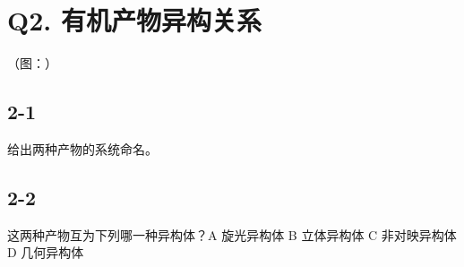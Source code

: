 \section*{Q2. 有机产物异构关系}
（图：）

\subsection*{2-1}
给出两种产物的系统命名。

\subsection*{2-2}
这两种产物互为下列哪⼀种异构体？A 旋光异构体 B ⽴体异构体 C ⾮对映异构体 D ⼏何异构体
